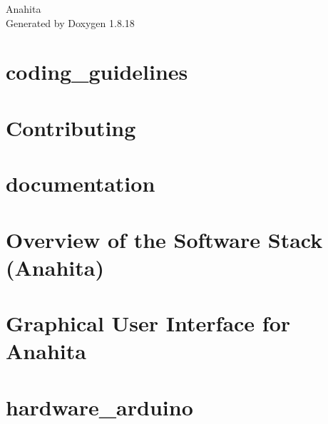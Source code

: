 \let\mypdfximage\pdfximage\def\pdfximage{\immediate\mypdfximage}\documentclass[twoside]{book}
\newcommand{\+}{\discretionary{\mbox{\scriptsize$\hookleftarrow$}}{}{}}
\newcommand{\clearemptydoublepage}{%
  \newpage{\pagestyle{empty}\cleardoublepage}%
}
\begin{document}
\hypersetup{pageanchor=false,
             bookmarksnumbered=true,
             pdfencoding=unicode
            }
\begin{titlepage}
\vspace*{7cm}
\begin{center}%
{\Large Anahita }\\
\vspace*{1cm}
{\large Generated by Doxygen 1.8.18}\\
\end{center}
\end{titlepage}
\clearemptydoublepage
{}
\tableofcontents
\clearemptydoublepage
{}
\hypersetup{pageanchor=true}

\chapter{coding\+\_\+guidelines}
\label{md_coding_docs_coding_guidelines}

\chapter{Contributing}
\label{md_coding_docs_contributing}

\chapter{documentation}
\label{md_coding_docs_documentation}

\chapter{Overview of the Software Stack (Anahita)}
\label{md_coding_docs_Overview}

\chapter{Graphical User Interface for Anahita}
\label{md_debug_layer_anahita_gui_README}

\chapter{hardware\+\_\+arduino}
\label{md_hardware_layer_hardware_arduino_README}

\end{document}

